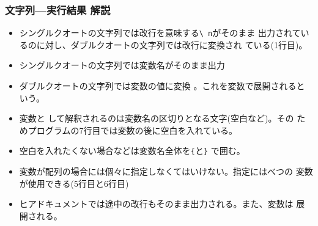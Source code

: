 \begin{frame}[containsverbatim]
\frametitle{文字列---実行結果 解説}
\begin{itemize}
 \item シングルクオートの文字列では改行を意味する\texttt{\textbackslash
       n}がそのまま
       出力されているのに対し、ダブルクオートの文字列では改行に変換され
       ている(1行目)。
 \item シングルクオートの文字列では変数名がそのまま出力
 \item ダブルクオートの文字列では変数の値に変換
       。これを変数で展開されるという。
\item 変数と
       して解釈されるのは変数名の区切りとなる文字(空白など)。その
       ためプログラムの7行目では変数の後に空白を入れている。
 \item 空白を入れたくない場合などは変数名全体を\texttt{\{}と\texttt{\}}
       で囲む。
 \item 変数が配列の場合には個々に指定しなくてはいけない。指定にはべつの
       変数が使用できる(5行目と6行目)
 \item ヒアドキュメントでは途中の改行もそのまま出力される。また、変数は
       展開される。
\end{itemize}
\end{frame}
